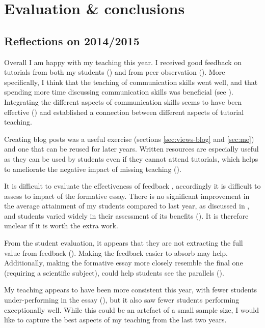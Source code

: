 \chapter{Evaluation \& conclusions}\label{ch:conc}

\section{Reflections on 2014/2015}

Overall I am happy with my teaching this year. I received good feedback on tutorials from both my students () and from peer observation (). More specifically, I think that the teaching of communication skills went well, and that spending more time discussing communication skills was beneficial (see ). Integrating the different aspects of communication skills seems to have been effective () and established a connection between different aspects of tutorial teaching.

Creating blog posts was a useful exercise (sections \ref{sec:views-blog} and \ref{sec:me}) and one that can be reused for later years. Written resources are especially useful as they can be used by students even if they cannot attend tutorials, which helps to ameliorate the negative impact of missing teaching ().

It is difficult to evaluate the effectiveness of feedback \citep{Price2010}, accordingly it is difficult to assess to impact of the formative essay. There is no significant improvement in the average attainment of my students compared to last year, as discussed in , and students varied widely in their assessment of its benefits (). It is therefore unclear if it is worth the extra work.

From the student evaluation, it appears that they are not extracting the full value from feedback (). Making the feedback easier to absorb may help. Additionally, making the formative essay more closely resemble the final one (requiring a scientific subject), could help students see the parallels ().

My teaching appears to have been more consistent this year, with fewer students under-performing in the essay (), but it also saw fewer students performing exceptionally well. While this could be an artefact of a small sample size, I would like to capture the best aspects of my teaching from the last two years.

